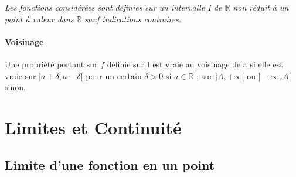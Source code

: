 

\textsl{Les fonctions considérées sont définies sur un intervalle I de $\mathbb{R}$ non réduit à un point à valeur dans $\mathbb{R}$ sauf indications contraires.} 
\minitoc ${}$ \traitd
 \paragraph{Voisinage}
    Une propriété portant sur $f$ définie sur I est vraie au voisinage de a si elle est vraie sur $]a+\delta , a-\delta[$ pour un certain $\delta>0$ si $a\in\mathbb{R}$ ; sur $]A, +\infty [$ ou $]-\infty , A[$ sinon. \trait 

\section{Limites et Continuité}
\subsection{Limite d'une fonction en un point}
       \traitd
